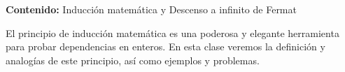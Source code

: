 {\Large\textbf{Contenido:} Inducción matemática y Descenso a infinito de Fermat}

El principio de inducción matemática es una poderosa y elegante herramienta para probar dependencias en enteros.
En esta clase veremos la definición y analogías de este principio, así como ejemplos y problemas.